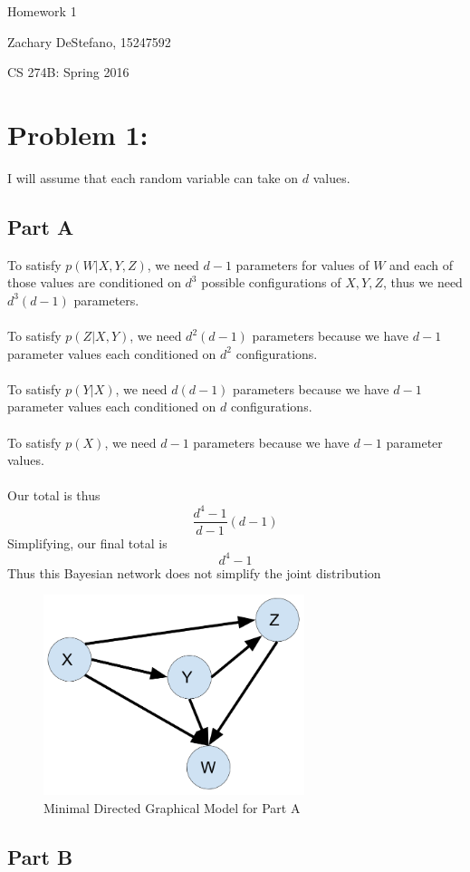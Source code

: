\documentclass[twoside,11pt]{article}
\theoremstyle{definition}
\begin{document}
\centerline{\Large Homework 1}
\centerline{Zachary DeStefano, 15247592}
\centerline{CS 274B: Spring 2016}

\section*{Problem 1: }

I will assume that each random variable can take on $d$ values.

\subsection*{Part A}

To satisfy $p(W|X,Y,Z)$, we need $d-1$ parameters for values of $W$ and each of those values are conditioned on $d^3$ possible configurations of $X,Y,Z$, thus we need $d^3(d-1)$ parameters.\\
\\
To satisfy $p(Z|X,Y)$, we need $d^2(d-1)$ parameters because we have $d-1$ parameter values each conditioned on $d^2$ configurations. \\
\\
To satisfy $p(Y|X)$, we need $d(d-1)$ parameters because we have $d-1$ parameter values each conditioned on $d$ configurations.\\
\\
To satisfy $p(X)$, we need $d-1$ parameters because we have $d-1$ parameter values.\\
\\
Our total is thus
\[
\frac{d^4-1}{d-1}(d-1)
\]
Simplifying, our final total is
\[
d^4-1
\]
Thus this Bayesian network does not simplify the joint distribution
\begin{figure}[h]
\centering
\includegraphics[width=3in]{HW1_Prob1_partA.png}
\caption{Minimal Directed Graphical Model for Part A}
\end{figure}
\newpage
\subsection*{Part B}
\end{document}

